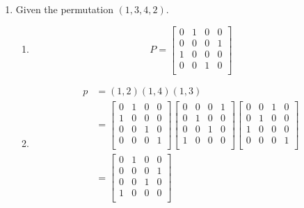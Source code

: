 \documentclass[12pt,letterpaper]{article}
\begin{document}
\begin{enumerate}
    \item
      Given the permutation $(1,3,4,2)$.
      \begin{enumerate}
        \item
          \[
            P =
            \begin{bmatrix}
              0 & 1 & 0 & 0 \\
              0 & 0 & 0 & 1 \\
              1 & 0 & 0 & 0 \\
              0 & 0 & 1 & 0 \\
            \end{bmatrix}
          \]
        \item
          \begin{align*}
            p &= (1, 2)(1, 4)(1, 3) \\
            &=
              \begin{bmatrix}
                0 & 1 & 0 & 0 \\
                1 & 0 & 0 & 0 \\
                0 & 0 & 1 & 0 \\
                0 & 0 & 0 & 1 \\
              \end{bmatrix}
              \begin{bmatrix}
                0 & 0 & 0 & 1 \\
                0 & 1 & 0 & 0 \\
                0 & 0 & 1 & 0 \\
                1 & 0 & 0 & 0 \\
              \end{bmatrix}
              \begin{bmatrix}
                0 & 0 & 1 & 0 \\
                0 & 1 & 0 & 0 \\
                1 & 0 & 0 & 0 \\
                0 & 0 & 0 & 1 \\
              \end{bmatrix} \\
            &=
              \begin{bmatrix}
                0 & 1 & 0 & 0 \\
                0 & 0 & 0 & 1 \\
                0 & 0 & 1 & 0 \\
                1 & 0 & 0 & 0 \\
              \end{bmatrix}

\end{align*}
\end{enumerate}
\end{enumerate}
\end{document}
